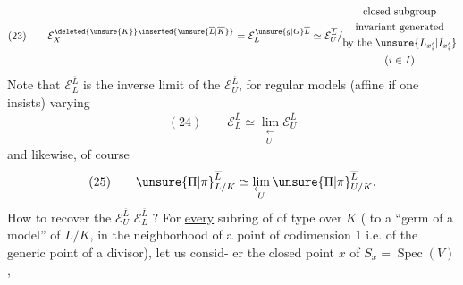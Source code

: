 \[
(23)\qquad
\mathcal E_X^{\deleted{\unsure{K}}\inserted{\unsure{\overline L|\overline K}}}
=\mathcal E_L^{\unsure{g|G}\overline L}
\simeq\mathcal E_U^{\overline L}/\begin{gathered}\text{closed subgroup}\\\text{invariant generated}\\\text{by the }\unsure{L_{x_i'}|I_{x_i'}}\\(i\in I)\end{gathered}
\]
Note that $\mathcal E_L^{\overline L}$ is the inverse
limit of the $\mathcal E_U^{\overline L}$, for
regular models (affine if one insists)
varying
\[
(24)\qquad\mathcal E_L^{\overline L}\simeq\lim_{\substack{\longleftarrow\\U}}\mathcal E_U^{\overline L}
\]
and likewise, of course
\[
(25)\qquad\unsure{\Pi|\pi}_{L/K}^{\overline L}\simeq\lim_{\substack{\longleftarrow\\U}}\unsure{\Pi|\pi}_{U/K}^{\overline L}.
\]
How to recover the $\mathcal E_U^{\overline L}$ 
$\mathcal E_L^{\overline L}$ ? For \uline{every}
subring  of  of
 type over $K$ ( to a
``germ of a model'' of $L/K$, in the
neighborhood of a point of codimension $1$ i.e.
of the generic point of a divisor), let us consid-\newline
er the closed point $x$ of $S_x=\operatorname{Spec}(V)$,

\margin{In the\newline
considerations which\newline
follow, $K$ (and $X,U$)\newline
for the time being play\newline
no role --- \unsure{(|[}But one could\newline
``more generally'' \unsure{consider|replace} decomposition groups\newline
\deleted{\unsure{of relative dimension}} of one of the ``$U$''\newline
\uline{but only} \uline{\unsure{épis-comp|épi-s-comp|épi-scop}} (the ``generalization'' being\newline
trivial,\newline
$\mathcal E_L\longrightarrow\mathcal E_U$)}


